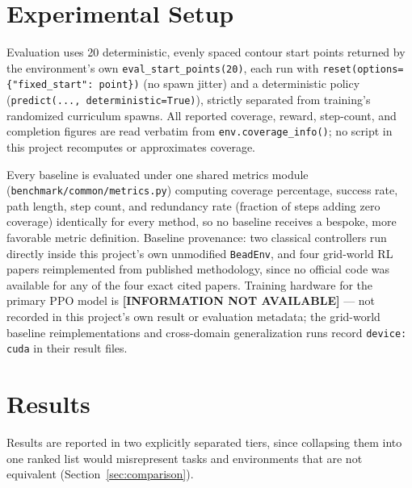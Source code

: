 \documentclass[conference]{IEEEtran}
\begin{document}
\section{Experimental Setup}
\label{sec:setup}

Evaluation uses 20 deterministic, evenly spaced contour start points returned by the environment's own \texttt{eval\_start\_points(20)}, each run with \texttt{reset(options=\{"fixed\_start": point\})} (no spawn jitter) and a deterministic policy (\texttt{predict(..., deterministic=True)}), strictly separated from training's randomized curriculum spawns. All reported coverage, reward, step-count, and completion figures are read verbatim from \texttt{env.coverage\_info()}; no script in this project recomputes or approximates coverage.

Every baseline is evaluated under one shared metrics module (\texttt{benchmark/common/metrics.py}) computing coverage percentage, success rate, path length, step count, and redundancy rate (fraction of steps adding zero coverage) identically for every method, so no baseline receives a bespoke, more favorable metric definition. Baseline provenance: two classical controllers run directly inside this project's own unmodified \texttt{BeadEnv}, and four grid-world RL papers reimplemented from published methodology, since no official code was available for any of the four exact cited papers. Training hardware for the primary PPO model is \textbf{[INFORMATION NOT AVAILABLE]} --- not recorded in this project's own result or evaluation metadata; the grid-world baseline reimplementations and cross-domain generalization runs record \texttt{device: cuda} in their result files.

\section{Results}
\label{sec:results}

Results are reported in two explicitly separated tiers, since collapsing them into one ranked list would misrepresent tasks and environments that are not equivalent (Section~\ref{sec:comparison}).
\end{document}
